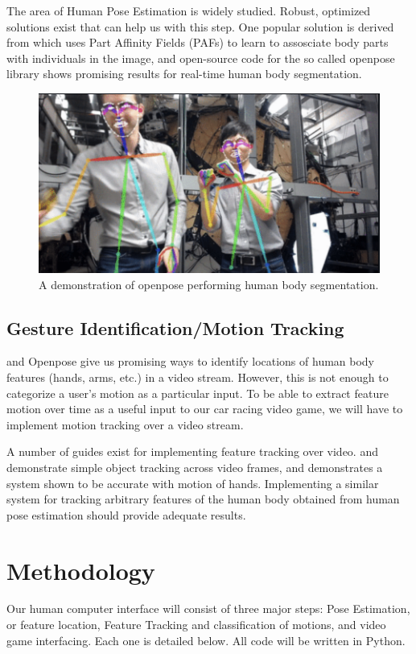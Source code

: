\documentclass[10pt,twocolumn,letterpaper]{article}
\begin{document}
The area of Human Pose Estimation is widely studied. Robust, optimized solutions exist 
that can help us with this step. One popular solution is derived from \cite{8765346} which uses Part Affinity Fields (PAFs) to learn to assosciate body parts with individuals in the image, and 
open-source code for the so called openpose library shows promising results for real-time 
human body segmentation. 

\begin{figure}[h]
    \centering
    \includegraphics[width = .8\linewidth]{images/openpose.png}
    \caption{A demonstration of openpose performing human body segmentation.}
\end{figure}

\subsection{Gesture Identification/Motion Tracking}
\cite{8765346} and Openpose give us promising ways to identify locations of human body features 
(hands, arms, etc.) in a video stream. However, this is not enough to categorize a user's motion 
as a particular input. To be able to extract feature motion over time as a useful input to our 
car racing video game, we will have to implement motion tracking over a video stream. 

A number of guides exist for implementing feature tracking over video. \cite{tracking_1} 
and \cite{tracking_2} demonstrate simple object tracking across video frames, and \cite{tracking_2} 
demonstrates a system shown to be accurate with motion of hands. Implementing a similar system for 
tracking arbitrary features of the human body obtained from human pose estimation should provide 
adequate results.

\section{Methodology}
Our human computer interface will consist of three major steps: Pose Estimation, or feature 
location, Feature Tracking and classification of motions, and video game interfacing. Each one 
is detailed below. All code will be written in Python.
\end{document}
